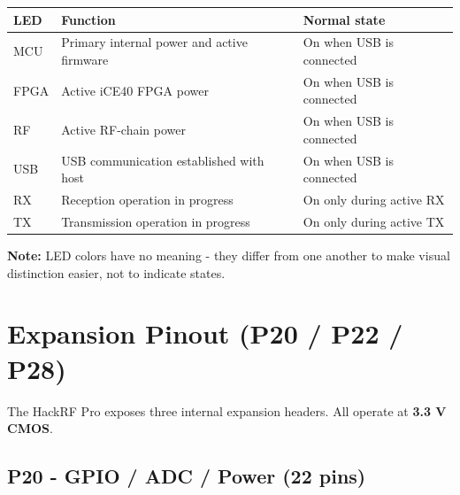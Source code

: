 \documentclass[11pt]{article}
\begin{document}
\begin{table}[h]
    \centering
    \begin{tabular}{p{}p{}p{}}
        \toprule
        \textbf{LED} & \textbf{Function} & \textbf{Normal state} \\
        \midrule
        MCU  & Primary internal power and active firmware & On when USB is connected \\
        FPGA & Active iCE40 FPGA power                   & On when USB is connected \\
        RF   & Active RF-chain power                     & On when USB is connected \\
        USB  & USB communication established with host   & On when USB is connected \\
        RX   & Reception operation in progress           & On only during active RX \\
        TX   & Transmission operation in progress        & On only during active TX \\
        \bottomrule
    \end{tabular}
\end{table}

\textbf{Note:} LED colors have no meaning - they differ from one another to make visual distinction easier, not to indicate states.

\section{Expansion Pinout (P20 / P22 / P28)}

The HackRF Pro exposes three internal expansion headers. All operate at \textbf{3.3 V CMOS}.

\subsection*{P20 - GPIO / ADC / Power (22 pins)}
\end{document}
